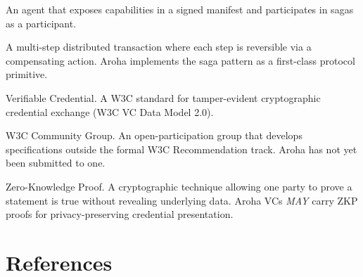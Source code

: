 \documentclass[11pt,a4paper]{article}
\begin{document}
\begin{description}[labelwidth=5cm, leftmargin=!, font=\ttfamily]
  \item[Provider]        An agent that exposes capabilities in a signed manifest
                         and participates in sagas as a participant.
  \item[Saga]            A multi-step distributed transaction where each step is
                         reversible via a compensating action. Aroha implements the
                         saga pattern as a first-class protocol primitive.
  \item[VC]              Verifiable Credential. A W3C standard for tamper-evident
                         cryptographic credential exchange (W3C VC Data Model 2.0).
  \item[W3C CG]          W3C Community Group. An open-participation group that
                         develops specifications outside the formal W3C
                         Recommendation track. Aroha has not yet been submitted to one.
  \item[ZKP]             Zero-Knowledge Proof. A cryptographic technique allowing
                         one party to prove a statement is true without revealing
                         underlying data. Aroha VCs \textit{MAY} carry ZKP proofs
                         for privacy-preserving credential presentation.
\end{description}

\section{References}
\end{document}
